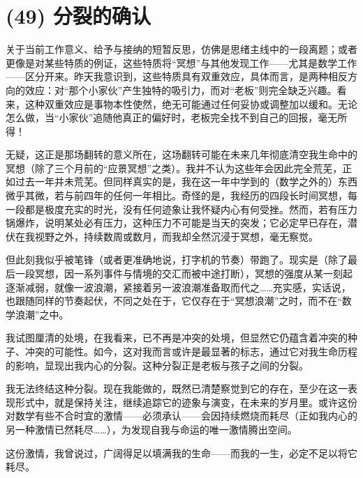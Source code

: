 \section{(49) 分裂的确认}

关于当前工作意义、给予与接纳的短暂反思，仿佛是思绪主线中的一段离题；或者更像是对某些特质的例证，这些特质将“冥想”与其他发现工作——尤其是数学工作——区分开来。昨天我意识到，这些特质具有双重效应，具体而言，是两种相反方向的效应：对“那个小家伙”产生独特的吸引力，而对“老板”则完全缺乏兴趣。看来，这种双重效应是事物本性使然，绝无可能通过任何妥协或调整加以缓和。无论怎么做，当“小家伙”追随他真正的偏好时，老板完全找不到自己的回报，毫无所得！

无疑，这正是那场翻转的意义所在，这场翻转可能在未来几年彻底清空我生命中的冥想（除了三个月前的“应景冥想”之类）。我并不认为这些年会因此完全荒芜，正如过去一年并未荒芜。但同样真实的是，我在这一年中学到的（数学之外的）东西微乎其微，若与前四年的任何一年相比。奇怪的是，我经历的四段长时间冥想，每一段都是极度充实的时光，没有任何迹象让我怀疑内心有何受挫。然而，若有压力锅爆炸，说明某处必有压力，这种压力不可能是当天的突发；它必定早已存在，潜伏在我视野之外，持续数周或数月，而我却全然沉浸于冥想，毫无察觉。

但此刻我似乎被笔锋（或者更准确地说，打字机的节奏）带跑了。现实是（除了最后一段冥想，因一系列事件与情境的交汇而被中途打断），冥想的强度从某一刻起逐渐减弱，就像一波浪潮，紧接着另一波浪潮准备取而代之……充实感，实话说，也跟随同样的节奏起伏，不同之处在于，它仅存在于“冥想浪潮”之时，而不在“数学浪潮”之中。

我试图厘清的处境，在我看来，已不再是冲突的处境，但显然它仍蕴含着冲突的种子、冲突的可能性。如今，这对我而言或许是最显著的标志，通过它对我生命历程的影响，显现出我内心的分裂。这种分裂正是老板与孩子之间的分裂。

我无法终结这种分裂。现在我能做的，既然已清楚察觉到它的存在，至少在这一表现形式中，就是保持关注，继续追踪它的迹象与演变，在未来的岁月里。或许这份对数学有些不合时宜的激情——必须承认——会因持续燃烧而耗尽（正如我内心的另一种激情已然耗尽……），为发现自我与命运的唯一激情腾出空间。

这份激情，我曾说过，广阔得足以填满我的生命——而我的一生，必定不足以将它耗尽。